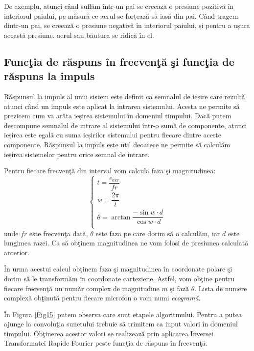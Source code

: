	De exemplu, atunci când suflăm într-un pai se creează o presiune pozitivă în interiorul paiului, pe măsură ce aerul se forțează să iasă din pai. Când tragem dintr-un pai, se creează o presiune negativă în interiorul paiului, și pentru a ușura această presiune, aerul sau băutura se ridică în el.
	
\subsection{Func\c{t}ia de r\u{a}spuns \^{i}n frecven\c{t}\u{a} \c{s}i func\c{t}ia de r\u{a}spuns la impuls}

	Răspunsul la impuls al unui sistem este definit ca semnalul de ieșire care rezultă atunci când un impuls este aplicat la intrarea sistemului. Acesta ne permite să prezicem cum va arăta ieșirea sistemului în domeniul timpului. Dacă putem descompune semnalul de intrare al sistemului într-o sumă de componente, atunci ieșirea este egală cu suma ieșirilor sistemului pentru fiecare dintre aceste componente. Răspunsul la impuls este util deoarece ne permite să calculăm ieșirea sistemelor pentru orice semnal de intrare.

	Pentru fiecare frecven\c{t}\u{a} din interval vom calcula faza \c{s}i magnitudinea:
	\begin{equation}
		\begin{cases}
			t = \dfrac{c_{aer}}{fr}\\
			w = \dfrac{2\pi}{t}\\
			\theta = \arctan{\dfrac{-\sin{w\cdot d}}{\cos{w\cdot d}}}\\
		\end{cases}
	\end{equation}
	unde $fr$ este frecven\c{t}a dat\u{a}, $\theta$ este faza pe care dorim s\u{a} o calcul\u{a}m, iar $d$ este lungimea razei. Ca s\u{a} ob\c{t}inem magnitudinea ne vom folosi de presiunea calculat\u{a} anterior.
	 
	
	\^{I}n urma acestui calcul ob\c{t}inem faza \c{s}i magnitudinea \^{i}n coordonate polare \c{s}i dorim s\u{a} le transform\u{a}m \^{i}n coordonate carteziene. Astfel, vom ob\c{t}ine pentru fiecare frecven\c{t}\u{a} un num\u{a}r complex de magnitudine $m$ \c{s}i faz\u{a} $\theta$. Lista de numere complex\u{a} ob\c{t}inut\u{a} pentru fiecare microfon o vom numi \textit{ecogram\u{a}}.
	 
	
	\^{I}n Figura \ref{Fig15} putem observa care sunt etapele algoritmului. Pentru a putea ajunge la convolu\c{t}ia sunetului trebuie s\u{a} trimitem ca input valori \^{i}n domeniul timpului. Ob\c{t}inerea acestor valori se realizeaz\u{a} prin aplicarea Inversei Transformatei Rapide Fourier peste func\c{t}ia de r\u{a}spuns \^{i}n frecven\c{t}\u{a}.
	 
